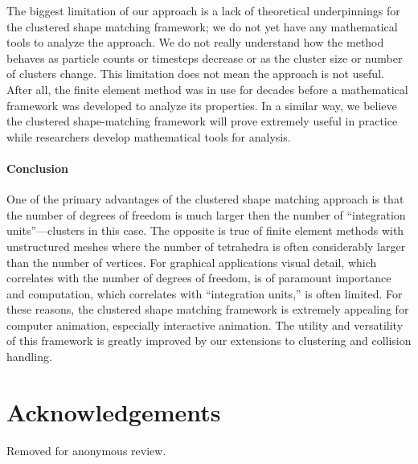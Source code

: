\documentclass[review]{acmsiggraph}
\begin{document}
{The biggest limitation of our approach is a lack of theoretical underpinnings for the clustered shape matching
framework; we do not yet have any mathematical tools to analyze the approach.  We do not really understand
how the method behaves as particle counts or timesteps decrease or as the cluster size or number of clusters change.
This limitation does not mean the approach is not useful.  After all, the finite element method was in use
for decades before a mathematical framework was developed to analyze its properties.  In a similar way,
we believe the clustered shape-matching framework will prove extremely useful in practice while
researchers develop mathematical tools for analysis. 

\paragraph{Conclusion} 
One of the primary advantages of the clustered shape matching approach is that the number of degrees of freedom
is much larger then the number of ``integration units''---clusters in this case.  The opposite is true of finite element
methods with unstructured meshes where the number of tetrahedra is often considerably larger than the number of vertices.  
For graphical applications visual detail, which correlates with the number of degrees of freedom, is of paramount importance
and computation, which correlates with ``integration units,'' is often limited.  
For these reasons, the clustered shape matching framework is extremely appealing for computer animation, 
especially interactive animation.  The utility and versatility of this framework is greatly improved by our extensions 
to clustering and collision handling.
}



\section*{Acknowledgements}
Removed for anonymous review.



\end{document}
